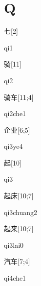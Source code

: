 ﻿%
\section*{Q}

\begin{verbete}[qi1]{七}[2]
\begin{pronuncia}{qi1}
\end{pronuncia}
\end{verbete}

\begin{verbete}[qi2]{骑}[11]
\begin{pronuncia}{qi2}
\end{pronuncia}
\end{verbete}

\begin{verbete}[qi2che1]{骑车}[11;4]
\begin{pronuncia}{qi2che1}
\end{pronuncia}
\end{verbete}

\begin{verbete}[qi3ye4]{企业}[6;5]
\begin{pronuncia}{qi3ye4}
\end{pronuncia}
\end{verbete}

\begin{verbete}[qi3]{起}[10]
\begin{pronuncia}{qi3}
\end{pronuncia}
\end{verbete}

\begin{verbete}[qi3chuang2]{起床}[10;7]
\begin{pronuncia}{qi3chuang2}
\end{pronuncia}
\end{verbete}

\begin{verbete}[qi3lai0]{起来}[10;7]
\begin{pronuncia}{qi3lai0}
\end{pronuncia}
\end{verbete}

\begin{verbete}[qi4che1]{汽车}[7;4]
\begin{pronuncia}{qi4che1}
\end{pronuncia}
\end{verbete}

